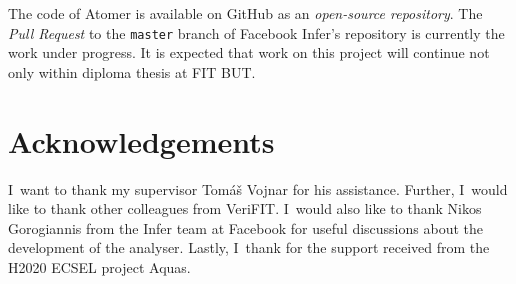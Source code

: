 The code of Atomer is available on GitHub as an \emph{open-source repository}.
The \emph{Pull Request} to the \texttt{master} branch of Facebook Infer's
repository is currently the work under progress. It is expected that work
on this project will continue not only within diploma thesis at FIT BUT.


\section*{Acknowledgements}
I~want to thank my supervisor Tomáš Vojnar for his assistance. Further,
I~would like to thank other colleagues from VeriFIT. I~would also like
to thank Nikos Gorogiannis from the Infer team at Facebook for useful
discussions about the development of the analyser. Lastly, I~thank for the
support received from the H2020 ECSEL project Aquas.
